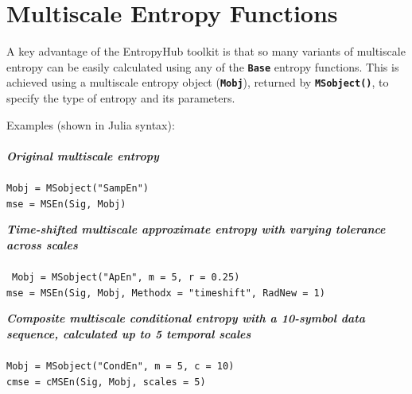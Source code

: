 \documentclass[12pt, a4paper, titlepage, openany]{book}
\begin{document}
\newpage
\section{Multiscale Entropy Functions}
\vspace{3em}

A key advantage of the EntropyHub toolkit is that so many variants of multiscale entropy can be easily
calculated using any of the \texttt{\textbf{Base}} entropy functions.  This is achieved using a multiscale entropy object (\texttt{\textbf{Mobj}}), returned by \texttt{\textbf{MSobject()}}, to specify the type of entropy and its parameters.
\begin{center}
\end{center}
 
\noindent Examples (shown in Julia syntax)$\colon$ \footnotesize
\\ \ \\ \noindent \emph{\textbf{Original multiscale entropy}} \cite{MS1}
\\ \ \\ \indent \texttt{Mobj = MSobject("SampEn") \\
\indent mse = MSEn(Sig, Mobj)}

\noindent \emph{\textbf{Time-shifted multiscale approximate entropy with varying tolerance across scales}} \cite{MS2} \\
\\ \ \indent \texttt{Mobj = MSobject("ApEn", m = 5, r = 0.25)\\
\indent mse = MSEn(Sig, Mobj, Methodx = "timeshift", RadNew = 1)}

\noindent \emph{\textbf{Composite multiscale conditional entropy with a 10-symbol data sequence, calculated up to 5 temporal scales}} \cite{cMS1}
\\ \ \\ \indent \texttt{Mobj = MSobject("CondEn", m = 5, c = 10)\\
\indent cmse = cMSEn(Sig, Mobj, scales = 5)}
\end{document}
